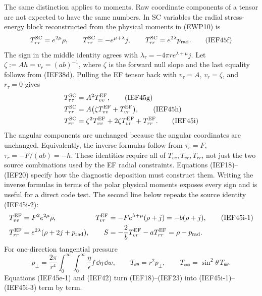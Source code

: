 The same distinction applies to moments.  Raw coordinate components of a
tensor are not expected to have the same numbers.  In SC variables the radial
stress-energy block reconstructed from the physical moments in (EWP10) is
\[
 T^{\rm SC}_{\tau\tau}=e^{2\mu}\rho,\qquad
 T^{\rm SC}_{\tau r}=-e^{\mu+\lambda}j,\qquad
 T^{\rm SC}_{rr}=e^{2\lambda}p_{\rm rad}.             \tag{IEF45f}
\]
The sign in the middle identity agrees with
\(\lambda_\tau=-4\pi r e^{\lambda+\mu}j\).
Let \(\zeta:=A h=v_r=(ab)^{-1}\), where \(\zeta\) is the forward null
slope and the last equality follows from
(IEF38d).  Pulling the EF tensor back with
\(v_\tau=A\), \(v_r=\zeta\), and \(r_\tau=0\) gives
\begin{align}
 T^{\rm SC}_{\tau\tau}
 &=A^2T^{\rm EF}_{vv},                                      \tag{IEF45g}\\
 T^{\rm SC}_{\tau r}
 &=A\bigl(\zeta T^{\rm EF}_{vv}+T^{\rm EF}_{vr}\bigr),   \tag{IEF45h}\\
 T^{\rm SC}_{rr}
 &=\zeta^2T^{\rm EF}_{vv}+2\zeta T^{\rm EF}_{vr}
   +T^{\rm EF}_{rr}.                                      \tag{IEF45i}
\end{align}
The angular components are unchanged because the angular coordinates are
unchanged.  Equivalently, the inverse formulas follow from
\(\tau_v=F\), \(\tau_r=-F/(ab)=-h\).  These identities require all of
\(T_{vv},T_{vr},T_{rr}\), not just the two source combinations used by the
EF radial constraints.  Equations (IEF18)--(IEF20) specify how the diagnostic
deposition must construct them.
Writing the inverse formulas in terms of the polar physical moments exposes
every sign and is useful for a direct code test.  The second line below
repeats the source identity (IEF45i-2):
\begin{align}
 T^{\rm EF}_{vv}&=F^2e^{2\mu}\rho,&
 T^{\rm EF}_{vr}&=-F e^{\lambda+\mu}(\rho+j)
                 =-b(\rho+j),                        \tag{IEF45i-1}\\
 T^{\rm EF}_{rr}&=e^{2\lambda}(\rho+2j+p_{\rm rad}),&
 S&=-\frac2bT^{\rm EF}_{vr}-aT^{\rm EF}_{rr}
   =\rho-p_{\rm rad}.                                    \notag
\end{align}
For one-direction tangential pressure
\[
 p_\perp=\frac{2\pi}{r^4}\int_0^\infty\!\!\int_0^\infty
       \frac{\eta}{\epsilon}f\,
       \dd\eta\,\dd w,
 \qquad T_{\theta\theta}=r^2p_\perp,\qquad
 T_{\phi\phi}=\sin^2\theta\,T_{\theta\theta}.       \tag{IEF45i-3}
\]
Equations (IEF45e-1) and (IEF42) turn (IEF18)--(IEF23) into
(IEF45i-1)--(IEF45i-3) term by term.

